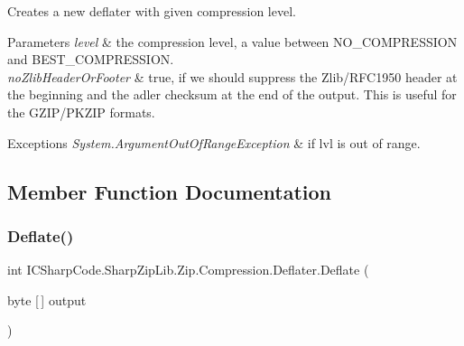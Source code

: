 Creates a new deflater with given compression level. 


\begin{DoxyParams}{Parameters}
{\em level} & the compression level, a value between N\+O\+\_\+\+C\+O\+M\+P\+R\+E\+S\+S\+I\+ON and B\+E\+S\+T\+\_\+\+C\+O\+M\+P\+R\+E\+S\+S\+I\+ON. \\
\hline
{\em no\+Zlib\+Header\+Or\+Footer} & true, if we should suppress the Zlib/\+R\+F\+C1950 header at the beginning and the adler checksum at the end of the output. This is useful for the G\+Z\+I\+P/\+P\+K\+Z\+IP formats. \\
\hline
\end{DoxyParams}

\begin{DoxyExceptions}{Exceptions}
{\em System.\+Argument\+Out\+Of\+Range\+Exception} & if lvl is out of range.\\
\hline
\end{DoxyExceptions}


\subsection{Member Function Documentation}
\mbox{\label{class_i_c_sharp_code_1_1_sharp_zip_lib_1_1_zip_1_1_compression_1_1_deflater_a68958680d1f6cdaef83e705908e5c082}} 
\subsubsection{\texorpdfstring{Deflate()}{Deflate()}\hspace{0.1cm}{\footnotesize\ttfamily [1/4]}}
{\footnotesize\ttfamily int I\+C\+Sharp\+Code.\+Sharp\+Zip\+Lib.\+Zip.\+Compression.\+Deflater.\+Deflate (\begin{DoxyParamCaption}\item[{byte \mbox{[}$\,$\mbox{]}}]{output }\end{DoxyParamCaption})\hspace{0.3cm}{\ttfamily [inline]}}



